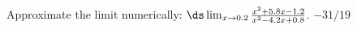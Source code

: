 {Approximate  the limit numerically: 
$\ds \lim_{x\to 0.2} \frac{x^2+5.8 x-1.2}{x^2-4.2 x+0.8}$.
}
{$-31/19$
}


